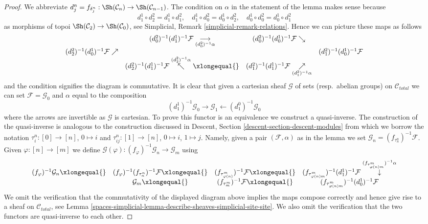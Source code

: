 \begin{proof}
We abbreviate
$d^n_j = f_{\delta^n_j} : \Sh(\mathcal{C}_n) \to \Sh(\mathcal{C}_{n - 1})$.
The condition on $\alpha$ in the statement of the lemma makes sense because
$$
d^1_1 \circ d^2_2 = d^1_1 \circ d^2_1, \quad
d^1_1 \circ d^2_0 = d^1_0 \circ d^2_2, \quad
d^1_0 \circ d^2_0 = d^1_0 \circ d^2_1
$$
as morphisms of topoi $\Sh(\mathcal{C}_2) \to \Sh(\mathcal{C}_0)$, see
Simplicial, Remark \ref{simplicial-remark-relations}. Hence we
can picture these maps as follows
$$
\begin{array}{cccc} & (d^2_0)^{-1}(d^1_1)^{-1}\mathcal{F} \underset{(d^2_0)^{-1}\alpha}{\longrightarrow} & (d^2_0)^{-1}(d^1_0)^{-1}\mathcal{F} \searrow &  \\ (d^2_2)^{-1}(d^1_0)^{-1}\mathcal{F} \nearrow &  &  & (d^2_1)^{-1}(d^1_0)^{-1}\mathcal{F} \\  & (d^2_2)^{-1}(d^1_1)^{-1}\mathcal{F} \overset{(d^2_2)^{-1}\alpha}{\nwarrow}\xlongequal{} & (d^2_1)^{-1}(d^1_1)^{-1}\mathcal{F} \underset{(d^2_1)^{-1}\alpha}{\nearrow} & \end{array}
$$
and the condition signifies the diagram is commutative. It is clear that
given a cartesian sheaf $\mathcal{G}$ of sets (resp.\ abelian groups)
on $\mathcal{C}_{total}$
we can set $\mathcal{F} = \mathcal{G}_0$ and $\alpha$ equal to the composition
$$
(d_1^1)^{-1}\mathcal{G}_0 \to \mathcal{G}_1
\leftarrow (d_1^0)^{-1}\mathcal{G}_0
$$
where the arrows are invertible as $\mathcal{G}$ is cartesian.
To prove this functor
is an equivalence we construct a quasi-inverse. The construction of
the quasi-inverse is analogous to the construction discussed in
Descent, Section \ref{descent-section-descent-modules} from which we borrow
the notation $\tau^n_i : [0] \to [n]$, $0 \mapsto i$ and
$\tau^n_{ij} : [1] \to [n]$, $0 \mapsto i$, $1 \mapsto j$.
Namely, given a pair $(\mathcal{F}, \alpha)$
as in the lemma we set $\mathcal{G}_n = (f_{\tau^n_n})^{-1}\mathcal{F}$.
Given $\varphi : [n] \to [m]$ we define
$\mathcal{G}(\varphi) : (f_\varphi)^{-1}\mathcal{G}_n \to \mathcal{G}_m$
using
$$
\begin{array}{cccc}(f_\varphi)^{-1}\mathcal{G}_n \xlongequal{} & (f_\varphi)^{-1}(f_{\tau^n_n})^{-1}\mathcal{F} \xlongequal{} & (f_{\tau^m_{\varphi(n)}})^{-1}\mathcal{F} \xlongequal{} & (f_{\tau^m_{\varphi(n)m}})^{-1}(d^1_1)^{-1}\mathcal{F}
\overset{(f_{\tau^m_{\varphi(n)m}})^{-1}\alpha}{\downarrow} \\  & \mathcal{G}_m \xlongequal{} & (f_{\tau^m_m})^{-1}\mathcal{F} \xlongequal{} & (f_{\tau^m_{\varphi(n)m}})^{-1}(d^1_0)^{-1}\mathcal{F}\end{array}
$$
We omit the verification that the commutativity of the displayed diagram
above implies the maps compose correctly and hence give rise to a
sheaf on $\mathcal{C}_{total}$, see
Lemma \ref{spaces-simplicial-lemma-describe-sheaves-simplicial-site-site}.
We also omit the verification
that the two functors are quasi-inverse to each other.
\end{proof}

